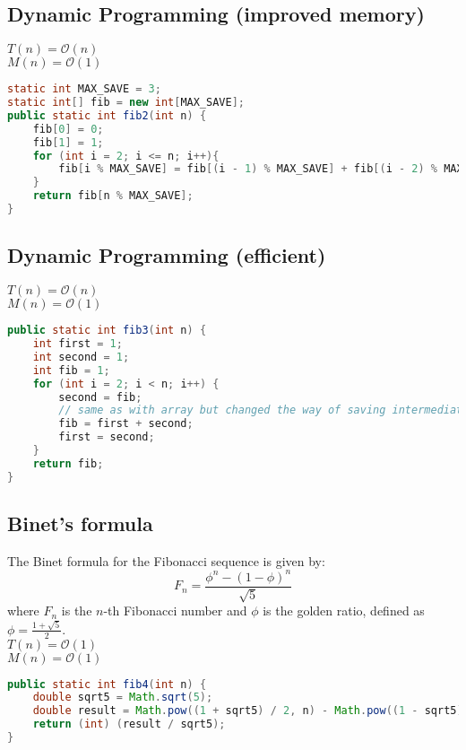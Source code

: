 \documentclass{article}
\begin{document}
\subsection{Dynamic Programming (improved memory)}
$T(n) = \mathcal{O}(n)$ \\
$M(n) = \mathcal{O}(1)$ \\
\begin{lstlisting}[language=Java]
static int MAX_SAVE = 3;
static int[] fib = new int[MAX_SAVE];
public static int fib2(int n) {
	fib[0] = 0;
	fib[1] = 1;
	for (int i = 2; i <= n; i++){
		fib[i % MAX_SAVE] = fib[(i - 1) % MAX_SAVE] + fib[(i - 2) % MAX_SAVE];
	}
	return fib[n % MAX_SAVE];
}
\end{lstlisting}

\subsection{Dynamic Programming (efficient)}
$T(n) = \mathcal{O}(n)$ \\
$M(n) = \mathcal{O}(1)$ \\
\begin{lstlisting}[language=Java]
public static int fib3(int n) {
	int first = 1;
	int second = 1;
	int fib = 1;
	for (int i = 2; i < n; i++) {
		second = fib;
		// same as with array but changed the way of saving intermediate results
		fib = first + second;
		first = second;
	}
	return fib;
}
\end{lstlisting}

\subsection{Binet's formula}
The Binet formula for the Fibonacci sequence is given by:
\begin{equation}
F_n = \frac{\phi^n - (1-\phi)^n}{\sqrt{5}}
\end{equation}
where $F_n$ is the $n$-th Fibonacci number and $\phi$ is the golden ratio, defined as $\phi = \frac{1+\sqrt{5}}{2}$.\\

$T(n) = \mathcal{O}(1)$ \\
$M(n) = \mathcal{O}(1)$ \\
\begin{lstlisting}[language=Java]
public static int fib4(int n) {
	double sqrt5 = Math.sqrt(5);
	double result = Math.pow((1 + sqrt5) / 2, n) - Math.pow((1 - sqrt5) / 2, n);
	return (int) (result / sqrt5);
}
\end{lstlisting}
\end{document}
